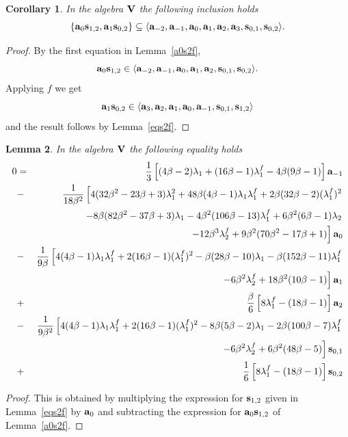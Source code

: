 \documentclass[a4paper]{amsart}
\newtheorem{lemma}{Lemma}[section]
\newtheorem{cor}[lemma]{Corollary}
\newcommand{\Vo}{{\bf V}}
\newcommand{\lmu}{\lambda_1}
\newcommand{\lmf}{\lambda_1^f}
\newcommand{\lmd}{\lambda_2}
\newcommand{\lmdf}{\lambda_2^f}
\newcommand{\bt}{\beta}
\newcommand{\ba}{{\bf a}}
\newcommand{\bs}{{\bf s}}
\begin{document}
\begin{cor}\label{cor:a0s2f}
In the algebra $\Vo$ the following inclusion holds
$$\{ \ba_0 \bs_{1,2}, \ba_1\bs_{0,2}\} \subseteq  \langle \ba_{-2},  \ba_{-1},  \ba_{0},  \ba_{1},  \ba_{2},  \ba_{3},  \bs_{0,1}, \bs_{0,2}\rangle .
$$  
\end{cor}
\begin{proof}
By the first equation in Lemma~\ref{a0s2f}, 
$$\ba_0 \bs_{1,2}\in \langle \ba_{-2},  \ba_{-1},  \ba_{0},  \ba_{1},  \ba_{2},  \bs_{0,1}, \bs_{0,2}\rangle .
$$ Applying $f$ we get
$$\ba_1 \bs_{0,2}\in \langle \ba_{3},  \ba_{2},  \ba_{1},  \ba_{0},  \ba_{-1},  \bs_{0,1}, \bs_{1,2}\rangle 
$$ and the result follows  by Lemma~\ref{eqs2f}.
\end{proof}

\begin{lemma}\label{rel1} %
In the algebra $\Vo$ the following equality holds
\begin{eqnarray*}
0&=&\frac{1}{3}\left [(4\bt-2)\lmu+(16\bt-1)\lmf-4\bt(9\bt-1)\right ]\ba_{-1}\\
&-&\frac{1}{18\bt^2}\left[4(32\bt^2-23\bt+3)\lmu^2+48\bt(4\bt-1)\lmu\lmf+2\bt(32\bt-2)(\lmf)^2 \right . \\
&& \left . -8\bt(82\bt^2-37\bt+3)\lmu-4\bt^2(106\bt-13)\lmf+6\bt^2(6\bt-1)\lmd \right . \\
&& \left . -12\bt^3\lmdf+9\bt^2(70\bt^2-17\bt+1)\right ]\ba_0\\
&-& \frac{1}{9\bt}\left [ 4(4\bt-1)\lmu \lmf+2(16\bt-1)(\lmf)^2-\bt(28\bt-10)\lmu-\bt(152\bt-11)\lmf \right . \\
&& \left .-6\bt^2\lmdf+18\bt^2(10\bt-1)\right ]\ba_1\\
&+&\frac{\bt}{6}\left [8\lmf-(18\bt-1)\right ]\ba_2\\
&-&\frac{1}{9\bt^2}\left  [ 4(4\bt-1)\lmu \lmf+2(16\bt-1)(\lmf)^2-8\bt(5\bt-2)\lmu-2\bt(100\bt-7)\lmf \right . \\
&& \left . -6\bt^2\lmdf+6\bt^2(48\bt-5) \right ]\bs_{0,1}\\
&+&\frac{1}{6}\left [ 8\lmf-(18\bt-1) \right ]\bs_{0,2}
\end{eqnarray*}
\end{lemma}
\begin{proof}
This is obtained by multiplying the expression for $\bs_{1,2}$ given in Lemma~\ref{eqs2f} by $\ba_0$ and subtracting the expression for $\ba_0\bs_{1,2}$ of Lemma~\ref{a0s2f}.
\end{proof}
\end{document}
